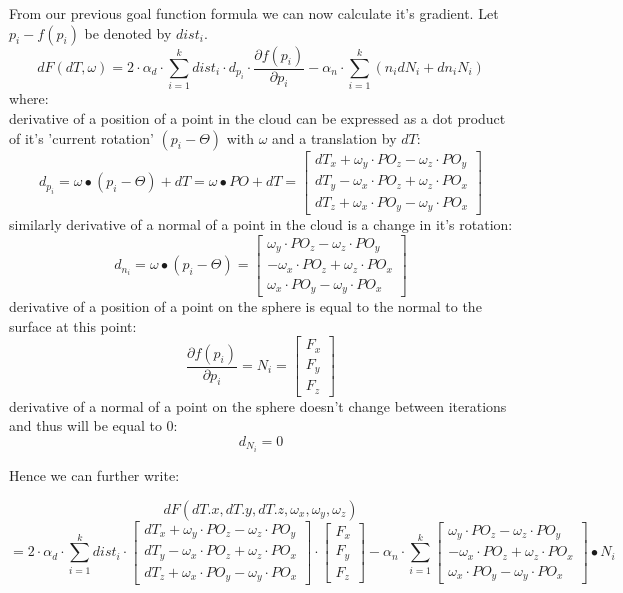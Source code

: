 \documentclass{book}
\begin{document}
From our previous goal function formula we can now calculate it's gradient. Let $p_i-f(p_i)$ be denoted by $dist_i$.
$$dF(dT, \omega) = 2\cdot \alpha_d \cdot \sum_{i=1}^{k}dist_i \cdot d_{p_i} \cdot \frac{\partial f(p_i)}{\partial p_i} - \alpha_n \cdot \sum_{i=1}^{k}(n_idN_i + dn_iN_i)$$
where: 
\\derivative of a position of a point in the cloud can be expressed as a dot product of it's 'current rotation' $(p_i - \Theta)$ with $\omega$ and a translation by $dT$:
$$d_{p_i} = \omega \bullet (p_i - \Theta) + dT = \omega \bullet PO + dT =
\begin{bmatrix}
	dT_x + \omega_y\cdot PO_z - \omega_z\cdot PO_y\\
	dT_y - \omega_x\cdot PO_z + \omega_z\cdot PO_x\\
	dT_z + \omega_x\cdot PO_y - \omega_y\cdot PO_x
\end{bmatrix}$$
similarly derivative of a normal of a point in the cloud is a change in it's rotation:
$$d_{n_i} = \omega \bullet (p_i - \Theta) = 
\begin{bmatrix}
	\omega_y\cdot PO_z - \omega_z\cdot PO_y\\
	- \omega_x\cdot PO_z + \omega_z\cdot PO_x\\
	\omega_x\cdot PO_y - \omega_y\cdot PO_x
\end{bmatrix}$$
derivative of a position of a point on the sphere is equal to the normal to the surface at this point:
$$\frac{\partial f(p_i)}{\partial p_i} = N_i =
\begin{bmatrix}
	F_x\\
	F_y\\
	F_z
\end{bmatrix}$$
derivative of a normal of a point on the sphere doesn't change between iterations and thus will be equal to 0:
$$d_{N_i} = 0$$

Hence we can further write:

$$dF(dT.x, dT.y, dT.z, \omega_x, \omega_y, \omega_z)$$
$$ = 2\cdot \alpha_d \cdot \sum_{i=1}^{k}dist_i \cdot 
\begin{bmatrix}
	dT_x + \omega_y\cdot PO_z - \omega_z\cdot PO_y\\
	dT_y - \omega_x\cdot PO_z + \omega_z\cdot PO_x\\
	dT_z + \omega_x\cdot PO_y - \omega_y\cdot PO_x
\end{bmatrix}
\cdot 
\begin{bmatrix}
	F_x\\
	F_y\\
	F_z
\end{bmatrix}
-\alpha_n \cdot \sum_{i=1}^{k}
\begin{bmatrix}
	\omega_y\cdot PO_z - \omega_z\cdot PO_y\\
	- \omega_x\cdot PO_z + \omega_z\cdot PO_x\\
	\omega_x\cdot PO_y - \omega_y\cdot PO_x
\end{bmatrix} \bullet N_i$$
\end{document}
